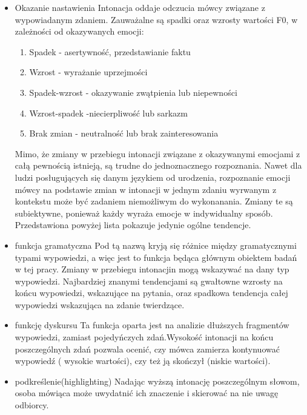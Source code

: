 \documentclass[a4paper,12 pt]{article}
\begin{document}
\begin{itemize}
\item{Okazanie nastawienia} 
\leavevmode
\newline
Intonacja oddaje odczucia mówcy związane z wypowiadanym zdaniem. Zauważalne są spadki oraz wzrosty wartości F0, w zależności od okazywanych emocji:
\begin{enumerate}
\item{Spadek - asertywność, przedstawianie faktu}
\item{Wzrost - wyrażanie uprzejmości}
\item{Spadek-wzrost - okazywanie zwątpienia lub niepewności}
\item{Wzrost-spadek -niecierpliwość lub sarkazm}
\item{Brak zmian - neutralność lub brak zainteresowania}
\end{enumerate}
Mimo, że zmiany w przebiegu intonacji związane z okazywanymi emocjami z całą pewnością istnieją, są trudne do jednoznacznego rozpoznania. Nawet dla ludzi posługujących się danym językiem od urodzenia, rozpoznanie emocji mówcy na podstawie zmian w intonacji w jednym zdaniu wyrwanym z kontekstu może być zadaniem niemożliwym do wykonanania. Zmiany te są subiektywne, ponieważ każdy wyraża emocje w indywidualny sposób. Przedstawiona powyżej lista pokazuje jedynie ogólne tendencje.
\item{funkcja gramatyczna}
\leavevmode
\newline
Pod tą nazwą kryją się różnice między gramatycznymi typami wypowiedzi, a więc jest to funkcja będąca głównym obiektem badań w tej pracy. Zmiany w przebiegu intonacjin mogą wskazywać na dany typ wypowiedzi. Najbardziej znanymi tendencjami są gwałtowne wzrosty na końcu wypowiedzi, wskazujące na pytania, oraz spadkowa tendencja całej wypowiedzi wskazująca na zdanie twierdzące.
\item{funkcję dyskursu} 
\leavevmode
\newline
Ta funkcja oparta jest na analizie dłuższych fragmentów wypowiedzi, zamiast pojedyńczych zdań.Wysokość intonacji na końcu poszczególnych zdań pozwala ocenić, czy mówca zamierza kontynuować wypowiedź ( wysokie wartości), czy też ją skończył (niskie wartości).

\item{podkreślenie(highlighting)}
\leavevmode
\newline
Nadając wyższą intonację poszczególnym słowom, osoba mówiąca może uwydatnić ich znaczenie i skierować na nie uwagę odbiorcy.
\end{itemize}
\end{document}
